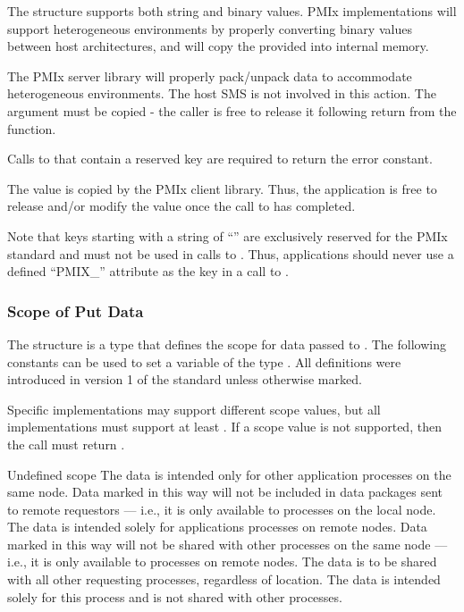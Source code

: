 The  structure supports both string and binary values.
PMIx implementations will support heterogeneous environments by properly converting binary values between host architectures, and will copy the provided  into internal memory.

\adviceimplstart
The PMIx server library will properly pack/unpack data to accommodate heterogeneous environments. The host \ac{SMS} is not involved in this action. The  argument must be copied - the caller is free to release it following return from the function.

Calls to  that contain a reserved key are required to return the  error constant.
\adviceimplend

\adviceuserstart
The value is copied by the PMIx client library. Thus, the application is free to release and/or modify the value once the call to  has completed.

Note that keys starting with a string of ``'' are exclusively reserved for the \ac{PMIx} standard and must not be used in calls to . Thus, applications should never use a defined ``PMIX_'' attribute as the key in a call to .
\adviceuserend

\subsubsection{Scope of Put Data}

The  structure is a  type that defines the scope for data passed to .
The following constants can be used to set a variable of the type . All definitions were introduced in version 1 of the standard unless otherwise marked.

Specific implementations may support different scope values, but all implementations must support at least .
If a scope value is not supported, then the  call must return .

\begin{constantdesc}
%
Undefined scope
%
The data is intended only for other application processes on the same node.
Data marked in this way will not be included in data packages sent to remote requestors --- i.e., it is only available to processes on the local node.
%
The data is intended solely for applications processes on remote nodes.
Data marked in this way will not be shared with other processes on the same node --- i.e., it is only available to  processes on remote nodes.
%
The data is to be shared with all other requesting processes, regardless of location.
%
The data is intended solely for this process and is not shared with other processes.
%
\end{constantdesc}


